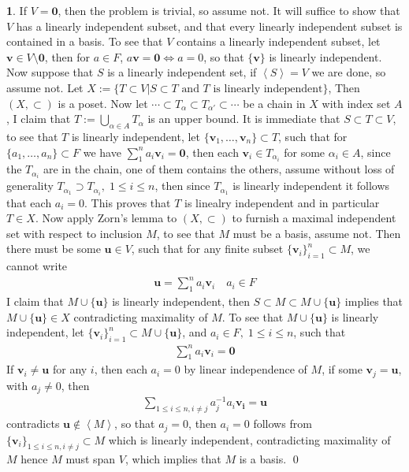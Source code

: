 \documentclass[11pt]{article}
\theoremstyle{definition}
\newtheorem{pb}{}
\newcommand{\set}[1]{\{#1\}}
\newcommand{\gen}[1]{\left\langle #1 \right\rangle}
\newcommand{\tand}{\text{ and }}
\begin{document}
    \begin{pb}
        If \(V = \mathbf{0}\), then the problem is trivial, so assume not. It will suffice to show that \(V\) has a linearly independent subset, and that every linearly independent subset is contained in a basis. To see that \(V\) contains a linearly independent subset, let \(\mathbf{v} \in V\setminus\mathbf{0}\), then for \(a \in F\), \(a\mathbf{v} = \mathbf{0} \iff a = 0\), so that \(\set{\mathbf{v}}\) is linearly independent. Now suppose that \(S\) is a linearly independent set, if \(\gen{S} = V\) we are done, so assume not. Let \(X := \set{T \subset V \vert S \subset T \tand T \text{ is linearly independent}}\), Then \((X,\subset)\) is a poset. Now let \(\cdots \subset T_{\alpha} \subset T_{\alpha'} \subset \cdots\) be a chain in \(X\) with index set \(A\), I claim that \(T := \bigcup_{\alpha \in A}T_\alpha\) is an upper bound. It is immediate that \(S \subset T \subset V\), to see that \(T\) is linearly independent, let \(\set{\mathbf{v}_1,\hdots,\mathbf{v}_n} \subset T\), such that for \(\set{a_1,\hdots,a_n} \subset F\) we have \(\sum_1^n a_i\mathbf{v}_i = \mathbf{0}\), then each \(\mathbf{v}_i \in T_{\alpha_i}\) for some \(\alpha_i \in A\), since the \(T_{\alpha_i}\) are in the chain, one of them contains the others, assume without loss of generality
        \(T_{\alpha_1} \supset T_{\alpha_i}, \; 1 \leq i \leq n\), then since \(T_{\alpha_1}\) is linearly independent it follows that each \(a_i = 0\). This proves that \(T\) is linealry independent and in particular \(T \in X\). Now apply Zorn's lemma to \((X,\subset)\) to furnish a maximal independent set with respect to inclusion \(M\), to see that \(M\) must be a basis, assume not. Then there must be some \(\mathbf{u} \in V\), such that for any finite subset \(\set{\mathbf{v}_i}_{i=1}^n \subset M\), we cannot write
        \begin{align*}
            \mathbf{u} = \sum_1^n a_i\mathbf{v}_i \quad a_i \in F
        \end{align*}
        I claim that \(M \cup \set{\mathbf{u}}\) is linearly independent, then \(S \subset M \subset M \cup \set{\mathbf{u}}\) implies that \(M \cup \set{\mathbf{u}} \in X\) contradicting maximality of \(M\). To see that \(M \cup \set{\mathbf{u}}\) is linearly independent, let \(\set{\mathbf{v}_i}_{i=1}^n \subset M \cup \set{\mathbf{u}}\), and \(a_i \in F, \; 1\leq i \leq n\), such that
        \begin{align*}
            \sum_1^n a_i\mathbf{v}_i = \mathbf{0}
        \end{align*}
        If \(\mathbf{v}_i \neq \mathbf{u}\) for any \(i\), then each \(a_i = 0\) by linear independence of \(M\), if some \(\mathbf{v}_j = \mathbf{u}\), with \(a_j \neq 0\), then
        \begin{align*}
            \sum_{1 \leq i \leq n, i \neq j}a_j^{-1}a_i\mathbf{v_i} = \mathbf{u}
        \end{align*}
        contradicts \(\mathbf{u} \not \in \gen{M}\), so that \(a_j = 0\), then \(a_i = 0\) follows from \(\set{\mathbf{v}_i}_{1 \leq i \leq n, i \neq j} \subset M\) which is linearly independent, contradicting maximality of \(M\) hence \(M\) must span \(V\), which implies that \(M\) is a basis. \qed
    \end{pb}
\end{document}

